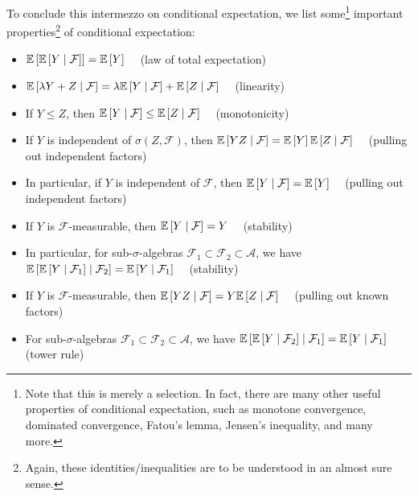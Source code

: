 To conclude this intermezzo on conditional expectation, we list some\footnote{Note that this is merely a selection. In fact, there are many other useful properties of conditional expectation, such as monotone convergence, dominated convergence, Fatou's lemma, Jensen's inequality, and many more.} important properties\footnote{Again, these identities/inequalities are to be understood in an almost sure sense.} of conditional expectation:
\begin{itemize}
    \label{itm: properties of conditional expectation}
    \item $\mathbb{E}\left[\mathbb{E}\left[Y \mathrel{|} \mathcal{F}\right]\right] = \mathbb{E}\left[Y\right] \quad$ (law of total expectation)

    \item $\mathbb{E}\left[\lambda Y + Z \mathrel{|} \mathcal{F}\right] = \lambda \mathbb{E}\left[Y \mathrel{|} \mathcal{F}\right] + \mathbb{E}\left[Z \mathrel{|} \mathcal{F}\right] \quad$ (linearity)

    \item If $Y \leq Z$, then $\mathbb{E}\left[Y \mathrel{|} \mathcal{F}\right] \leq \mathbb{E}\left[Z \mathrel{|} \mathcal{F}\right]\quad$ (monotonicity)

    \item If $Y$ is independent of $\sigma(Z, \mathcal{F})$, then $\mathbb{E}\left[YZ \mathrel{|} \mathcal{F}\right] = \mathbb{E}\left[Y\right] \mathbb{E}\left[Z \mathrel{|} \mathcal{F}\right] \quad$ (pulling out independent factors)
    
    \item In particular, if $Y$ is independent of $\mathcal{F}$, then $\mathbb{E}\left[Y \mathrel{|} \mathcal{F}\right] = \mathbb{E}\left[Y\right] \quad$ (pulling out independent factors)

    \item If $Y$ is $\mathcal{F}$-measurable, then $\mathbb{E}\left[Y \mathrel{|} \mathcal{F}\right] = Y \quad$ (stability)

    \item In particular, for sub-$\sigma$-algebras $\mathcal{F}_1 \subset \mathcal{F}_2 \subset \mathcal{A}$, we have $\mathbb{E}\left[\mathbb{E}\left[ Y \mathrel{|} \mathcal{F}_1\right] \mathrel{|} \mathcal{F}_2\right] = \mathbb{E}\left[ Y \mathrel{|} \mathcal{F}_1\right] \quad$ (stability)

    \item If $Y$ is $\mathcal{F}$-measurable, then $\mathbb{E}\left[YZ \mathrel{|} \mathcal{F}\right] = Y \mathbb{E}\left[Z \mathrel{|} \mathcal{F}\right] \quad$ (pulling out known factors)

    \item For sub-$\sigma$-algebras $\mathcal{F}_1 \subset \mathcal{F}_2 \subset \mathcal{A}$, we have $\mathbb{E}\left[\mathbb{E}\left[ Y \mathrel{|} \mathcal{F}_2\right] \mathrel{|} \mathcal{F}_1\right] = \mathbb{E}\left[ Y \mathrel{|} \mathcal{F}_1\right] \quad$ (tower rule)
\end{itemize}

